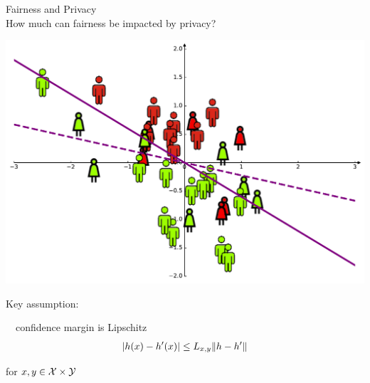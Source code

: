 \documentclass[17pt,aspectratio=169]{beamer}
\begin{document}
\begin{frame}{Fairness and Privacy\\[-0.5em]
    \normalsize How much can fairness be impacted by privacy?}
  \begin{minipage}{0.4\linewidth}
    \begin{center}
      \includegraphics[width=0.8\linewidth]{img/logistic_reg_changed_fair.pdf}
    \end{center}
  \end{minipage}%
  \begin{minipage}{0.6\linewidth}
    Key assumption:

    ~~confidence margin is Lipschitz
    \begin{align*}
      | h(x) - h'(x) | \le L_{x,y}\| h- h' \|
    \end{align*}

    \hfill for $x, y \in \mathcal X \times \mathcal Y$
  \end{minipage}%

\end{frame}








\end{document}
